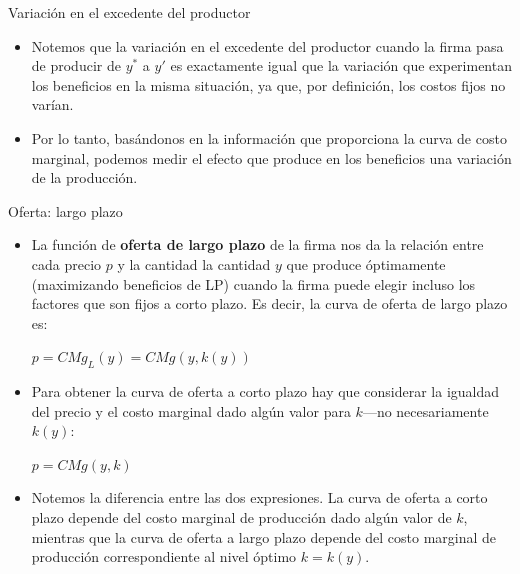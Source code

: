 \documentclass{beamer}
\theoremstyle{definition}
\begin{document}
\begin{frame}{Variaci\'on en el excedente del productor}
\begin{itemize}
\item Notemos que la variación en el excedente del productor cuando la firma pasa de producir de $y^*$ a $y'$ es exactamente igual que la variación que experimentan los beneficios en la misma situación, ya que, por definición, los costos fijos
no varían. 
\item Por lo tanto, basándonos en la información que proporciona la curva de
costo marginal, podemos medir el efecto que produce en los beneficios una variación de la producción.
\end{itemize}
\end{frame}

\begin{frame}{Oferta: largo plazo}
\begin{itemize}
\item La función de \textbf{oferta de largo plazo} de la firma nos da la relación entre cada precio $p$ y la cantidad la cantidad $y$ que produce óptimamente (maximizando beneficios de LP) cuando la firma puede elegir incluso los factores que son fijos a corto plazo. Es decir, la curva de oferta de largo plazo es:
\begin{center}
$p = CMg_L(y) = CMg(y, k(y))$
\end{center}
\item Para obtener la curva de oferta a corto plazo hay que considerar la igualdad del precio
y el costo marginal dado algún valor para $k$—no necesariamente $k(y)$:
\begin{center}
$p = CMg(y, k)$
\end{center}
\item Notemos la diferencia entre las dos expresiones. La curva de oferta a corto plazo
depende del costo marginal de producción dado algún valor de $k$, mientras que la curva de
oferta a largo plazo depende del costo marginal de producción correspondiente al nivel
óptimo $k=k(y)$.
\end{itemize}
\end{frame}
\end{document}
